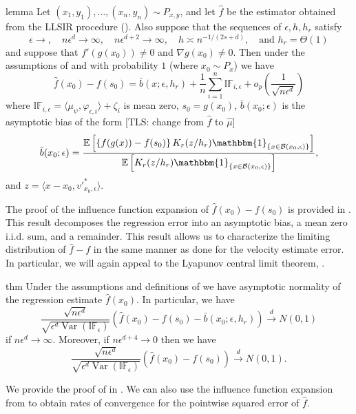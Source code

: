 \documentclass[11pt]{article}
\newcommand{\tls}[1]{{\color{cyan}[TLS: #1]}}
\begin{document}
\begin{restatable}{lemma}{} \label{thm: regression ptwise decomp}
    Let $(x_1, y_1), \dots, (x_n, y_n) \sim P_{x,y}$, and let $\hat{f}$ be the estimator obtained from the LLSIR procedure (). Also suppose that the sequences of $\epsilon, h, h_r$ satisfy \[\epsilon \rightarrow, \quad n\epsilon^d \rightarrow \infty, \quad n\epsilon^{d+2}\rightarrow\infty, \quad h\asymp n^{-1/(2s+d)}, \quad\text{and $h_r = \Theta(1)$}
    \] and suppose that $f'(g(x_0)) \neq 0$ and $\nabla g(x_0) \neq 0$. Then under the assumptions of  and with probability $1$ (where $x_0 \sim P_x$)  we have
    \begin{equation*}
    \hat{f}(x_0) - f(s_0) = \bar{b}(x; \epsilon, h_r) + \frac{1}{n}\sum_{i = 1}^n\mathbb{IF}_{i, \epsilon} + o_p\left(\frac{1}{\sqrt{n\epsilon^d}}\right)
    \end{equation*}
    where $\mathbb{IF}_{i, \epsilon} = \langle \mu_{\psi}, \varphi_{\epsilon, i}\rangle + \zeta_i$ is mean zero, $s_0 = g(x_0)$, $\bar{b}(x_0;\epsilon)$ is the asymptotic bias of the form \tls{change from $\hat f$ to $\hat \mu$}
    \begin{equation*}
        \bar{b}(x_0; \epsilon) = \frac{\mathbb{E}\left[\left\{f(g(x)) - f(s_0)\right\}K_r(z/h_r)\mathbbm{1}_{\{x\in \mathcal{B}(x_0, \epsilon)\}}\right]}{\mathbb{E}\left[K_r(z/h_r)\mathbbm{1}_{\{x\in \mathcal{B}(x_0, \epsilon)\}}\right]},
    \end{equation*}
    and $z = \langle x - x_0, v'^*_{x_0, \epsilon}\rangle$.
\end{restatable}
The proof of the influence function expansion of $\hat{f}(x_0) - f(s_0)$ is provided in . This result decomposes the regression error into an asymptotic bias, a mean zero i.i.d. sum, and a remainder. This result allows us to characterize the limiting distribution of $\hat{f} - f$ in the same manner as done for the velocity estimate error. In particular, we will again appeal to the Lyapunov central limit theorem, . 

\begin{restatable}{thm}{} \label{corr: central limit for f}
    Under the assumptions and definitions of  we have asymptotic normality of the regression estimate $\hat f(x_0)$. In particular, we have 
    \[\frac{\sqrt{n\epsilon^d}}{\sqrt{\epsilon^d\operatorname{Var}(\mathbb{IF}_{\epsilon})}}\left(\hat{f}(x_0) - f(s_0) - \bar{b}(x_0; \epsilon, h_r)\right) \overset{d}\rightarrow N(0, 1)\]
    if $n\epsilon^d \rightarrow \infty$. Moreover, if $n\epsilon^{d+4} \rightarrow 0$ then we have
    \[\frac{\sqrt{n\epsilon^d}}{\sqrt{\epsilon^d\operatorname{Var}(\mathbb{IF}_{\epsilon})}}\left(\hat{f}(x_0) - f(s_0)\right) \overset{d}\rightarrow N(0, 1).\]
\end{restatable}
We provide the proof of  in . We can also use the influence function expansion from  to obtain rates of convergence for the pointwise squared error of $\hat f$. 
\end{document}
